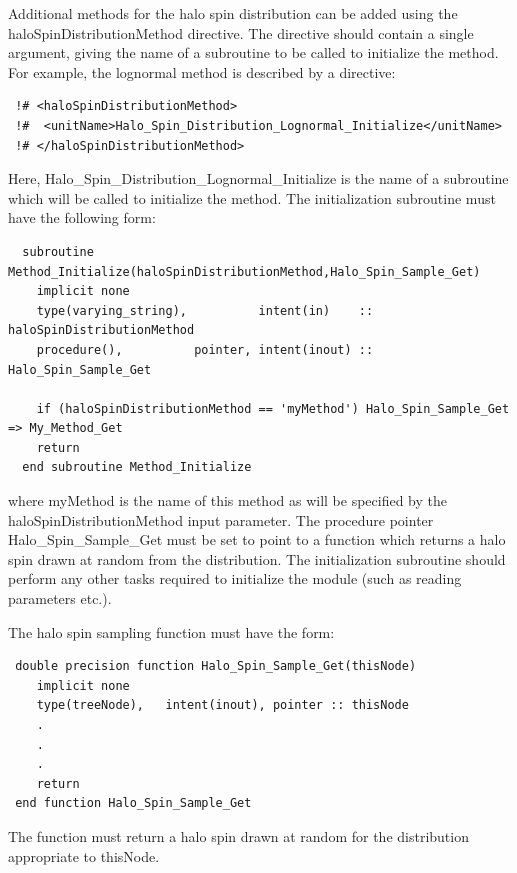 Additional methods for the halo spin distribution can be added using the {\normalfont \ttfamily haloSpinDistributionMethod} directive. The directive should contain a single argument, giving the name of a subroutine to be called to initialize the method. For example, the {\normalfont \ttfamily lognormal} method is described by a directive:
\begin{verbatim}
 !# <haloSpinDistributionMethod>
 !#  <unitName>Halo_Spin_Distribution_Lognormal_Initialize</unitName>
 !# </haloSpinDistributionMethod>
\end{verbatim}
Here, {\normalfont \ttfamily Halo\_Spin\_Distribution\_Lognormal\_Initialize} is the name of a subroutine which will be called to initialize the method. The initialization subroutine must have the following form:
\begin{verbatim}
  subroutine Method_Initialize(haloSpinDistributionMethod,Halo_Spin_Sample_Get)
    implicit none
    type(varying_string),          intent(in)    :: haloSpinDistributionMethod
    procedure(),          pointer, intent(inout) :: Halo_Spin_Sample_Get
    
    if (haloSpinDistributionMethod == 'myMethod') Halo_Spin_Sample_Get => My_Method_Get
    return
  end subroutine Method_Initialize
\end{verbatim}
where {\normalfont \ttfamily myMethod} is the name of this method as will be specified by the {\normalfont \ttfamily haloSpinDistributionMethod} input parameter. The procedure pointer {\normalfont \ttfamily Halo\_Spin\_Sample\_Get} must be set to point to a function which returns a halo spin drawn at random from the distribution. The initialization subroutine should perform any other tasks required to initialize the module (such as reading parameters etc.).

The halo spin sampling function must have the form:
\begin{verbatim}
 double precision function Halo_Spin_Sample_Get(thisNode)
    implicit none
    type(treeNode),   intent(inout), pointer :: thisNode
    .
    .
    .
    return
 end function Halo_Spin_Sample_Get
\end{verbatim}
The function must return a halo spin drawn at random for the distribution appropriate to {\normalfont \ttfamily thisNode}. 

